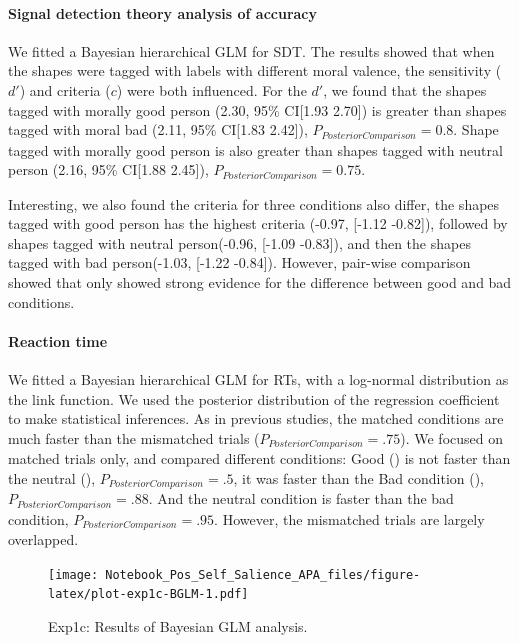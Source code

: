 \documentclass[
  english,
  man]{apa6}
\let\oldparagraph\paragraph
\renewcommand{\paragraph}[1]{\oldparagraph{#1}\mbox{}}
\begin{document}
\hypertarget{signal-detection-theory-analysis-of-accuracy-1}{%
\paragraph{Signal detection theory analysis of accuracy}\label{signal-detection-theory-analysis-of-accuracy-1}}

We fitted a Bayesian hierarchical GLM for SDT. The results showed that when the shapes were tagged with labels with different moral valence, the sensitivity (\(d'\)) and criteria (\(c\)) were both influenced. For the \(d'\), we found that the shapes tagged with morally good person (2.30, 95\% CI{[}1.93 2.70{]}) is greater than shapes tagged with moral bad (2.11, 95\% CI{[}1.83 2.42{]}), \(P_{PosteriorComparison} = 0.8\). Shape tagged with morally good person is also greater than shapes tagged with neutral person (2.16, 95\% CI{[}1.88 2.45{]}), \(P_{PosteriorComparison} = 0.75\).

Interesting, we also found the criteria for three conditions also differ, the shapes tagged with good person has the highest criteria (-0.97, {[}-1.12 -0.82{]}), followed by shapes tagged with neutral person(-0.96, {[}-1.09 -0.83{]}), and then the shapes tagged with bad person(-1.03, {[}-1.22 -0.84{]}). However, pair-wise comparison showed that only showed strong evidence for the difference between good and bad conditions.

\hypertarget{reaction-time-1}{%
\paragraph{Reaction time}\label{reaction-time-1}}

We fitted a Bayesian hierarchical GLM for RTs, with a log-normal distribution as the link function. We used the posterior distribution of the regression coefficient to make statistical inferences. As in previous studies, the matched conditions are much faster than the mismatched trials (\(P_{PosteriorComparison} = .75\)). We focused on matched trials only, and compared different conditions: Good () is not faster than the neutral (), \(P_{PosteriorComparison} = .5\), it was faster than the Bad condition (), \(P_{PosteriorComparison} = .88\). And the neutral condition is faster than the bad condition, \(P_{PosteriorComparison} = .95\). However, the mismatched trials are largely overlapped.

\begin{figure}
\centering
\texttt{[image: Notebook\_Pos\_Self\_Salience\_APA\_files/figure-latex/plot-exp1c-BGLM-1.pdf]}
\caption{\label{fig:plot-exp1c-BGLM}Exp1c: Results of Bayesian GLM analysis.}
\end{figure}
\end{document}
